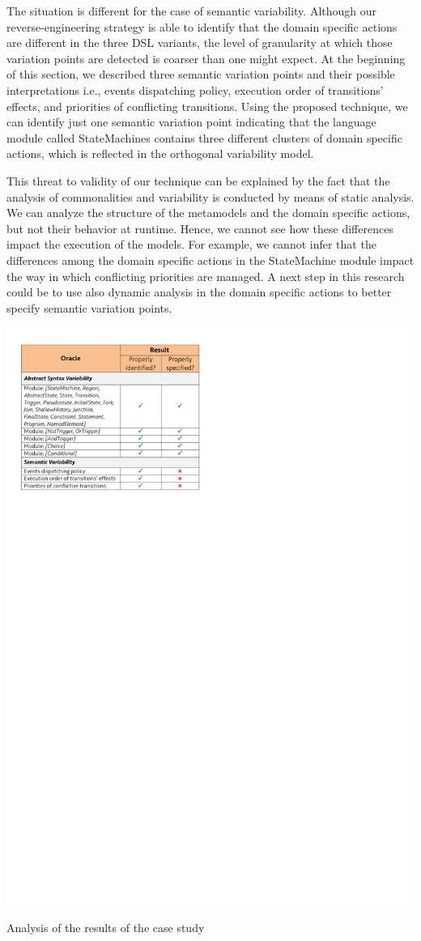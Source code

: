 The situation is different for the case of semantic variability. Although our reverse-engineering strategy is able to identify that the domain specific actions are different in the three DSL variants, the level of granularity at which those variation points are detected is coarser than one might expect. At the beginning of this section, we described three semantic variation points and their possible interpretations i.e., events dispatching policy, execution order of transitions' effects, and priorities of conflicting transitions. Using the proposed technique, we can identify just one semantic variation point indicating that the language module called StateMachines contains three different clusters of domain specific actions, which is reflected in the orthogonal variability model.

This threat to validity of our technique can be explained by the fact that the analysis of commonalities and variability is conducted by means of static analysis. We can analyze the structure of the metamodels and the domain specific actions, but not their behavior at runtime. Hence, we cannot see how these differences impact the execution of the models. For example, we cannot infer that the differences among the domain specific actions in the StateMachine module impact the way in which conflicting priorities are managed. A next step in this research could be to use also dynamic analysis in the domain specific actions to better specify semantic variation points.

\begin{table}
\centering
\includegraphics[width=1\linewidth]{images/validation-results}
\caption{Analysis of the results of the case study}
\label{fig:validation-results}
\end{table}
